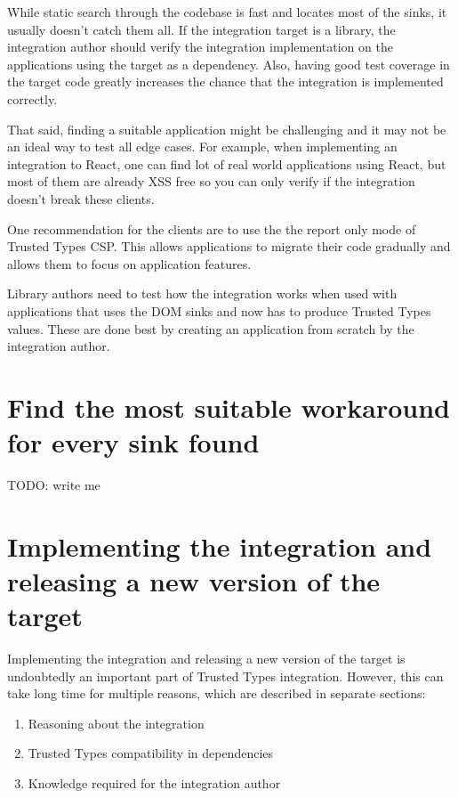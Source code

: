 While static search through the codebase is fast and locates most of the sinks, it usually doesn't
catch them all. If the integration target is a library, the integration author should verify the
integration implementation on the applications using the target as a dependency. Also, having good
test coverage in the target code greatly increases the chance that the integration is
implemented correctly.

That said, finding a suitable application might be challenging and it may not be an ideal way to
test all edge cases. For example, when implementing an integration to React, one can find lot of
real world applications using React, but most of them are already XSS free so you can only verify if
the integration doesn't break these clients.

One recommendation for the clients are to use the the report only mode of Trusted Types CSP. This
allows applications to migrate their code gradually and allows them to focus on application
features.

Library authors need to test how the integration works when used with applications that uses the
DOM sinks and now has to produce Trusted Types values. These are done best by creating an
application from scratch by the integration author.

\section{Find the most suitable workaround for every sink found}

TODO: write me

\section{Implementing the integration and releasing a new version of the target}

Implementing the integration and releasing a new version of the target is undoubtedly an important part
of Trusted Types integration. However, this can take long time for multiple reasons, which are
described in separate sections:

\begin{enumerate}
  \item Reasoning about the integration
  \item Trusted Types compatibility in dependencies
  \item Knowledge required for the integration author
\end{enumerate}

